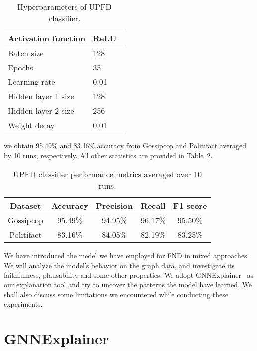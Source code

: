 \begin{table}
    \centering
    \begin{tabular}{|l|l|}
        \hline
        Activation function & ReLU~\parencite{ReLU_Nair} \\
        \hline
        Batch size          & 128                        \\
        \hline
        Epochs              & 35                         \\
        \hline
        Learning rate       & 0.01                       \\
        \hline
        Hidden layer 1 size & 128                        \\
        \hline
        Hidden layer 2 size & 256                        \\
        \hline
        Weight decay        & 0.01                       \\
        \hline
    \end{tabular}
    \caption[Hyperparameters of UPFD classifier.]{Hyperparameters of UPFD classifier.}
    \label{tab:UPFDClassifier_Hyperparameters}
\end{table}
we obtain 95.49\% and 83.16\% accuracy from Gossipcop and Politifact averaged by 10 runs, respectively. All other statistics are provided in Table~\ref{tab:UPFDClassifier_Results}.
\begin{table}
    \centering
    \begin{tabular}{c | c | c | c | c}
        \textbf{Dataset} & \textbf{Accuracy} & \textbf{Precision} & \textbf{Recall} & \textbf{F1 score} \\
        \hline
        Gossipcop        & 95.49\%           & 94.95\%            & 96.17\%         & 95.50\%           \\
        \hline
        Politifact       & 83.16\%           & 84.05\%            & 82.19\%         & 83.25\%           \\
    \end{tabular}
    \caption[UPFD classifier performance metrics averaged over 10 runs.]{UPFD classifier performance metrics averaged over 10 runs.}
    \label{tab:UPFDClassifier_Results}
\end{table}


We have introduced the model we have employed for FND in mixed approaches. We will analyze the model's behavior on the graph data, and investigate its faithfulness, plausability and some other properties. We adopt GNNExplainer~\parencite{GNNExplainer_Ying} as our explanation tool and try to uncover the patterns the model have learned. We shall also discuss some limitations we encountered while conducting these experiments.

\section{GNNExplainer}
\label{sec:GNNExplainer}


